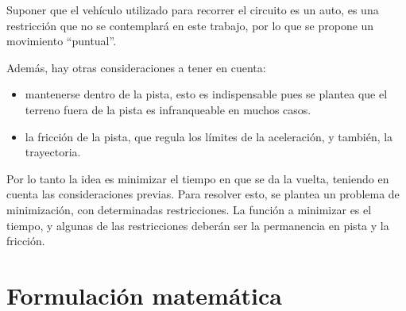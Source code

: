 \documentclass[a4paper,10pt]{book}
\begin{document}
Suponer que el vehículo utilizado para recorrer el circuito es un auto, es una restricción que no se contemplará en este trabajo, por lo que se propone un movimiento ``puntual''.

Además, hay otras consideraciones a tener en cuenta:
\begin{itemize}
 \item mantenerse dentro de la pista, esto es indispensable pues se plantea que el terreno fuera de la pista es infranqueable en muchos casos.

 \item la fricción de la pista, que regula los límites de la aceleración, y también, la trayectoria.
\end{itemize}
Por lo tanto la idea es minimizar el tiempo en que se da la vuelta, teniendo en cuenta las consideraciones previas.
Para resolver esto, se plantea un problema de minimización, con determinadas restricciones. La función a minimizar es el tiempo, y algunas de las restricciones deberán ser la permanencia en pista y la fricción.
\section{Formulación matemática}
\end{document}
